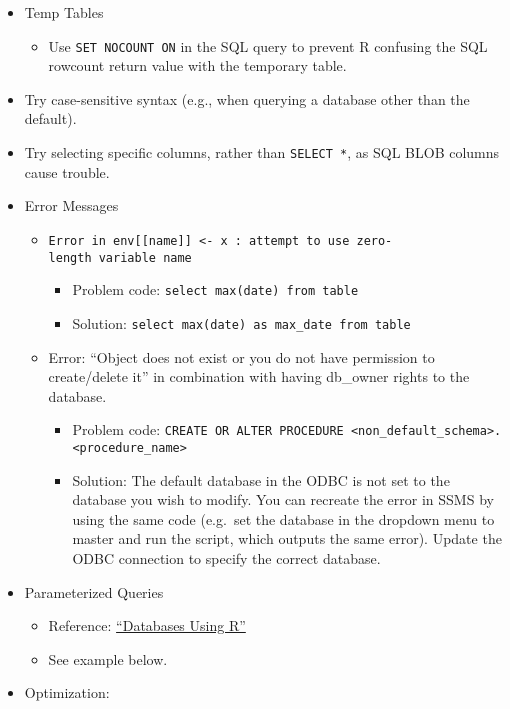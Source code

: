 \documentclass[
]{book}
\providecommand{\tightlist}{%
  \setlength{\itemsep}{0pt}\setlength{\parskip}{0pt}}
\begin{document}
\begin{itemize}
\tightlist
\item
  Temp Tables

  \begin{itemize}
  \tightlist
  \item
    Use \texttt{SET\ NOCOUNT\ ON} in the SQL query to prevent R confusing the SQL rowcount return value with the temporary table.
  \end{itemize}
\item
  Try case-sensitive syntax (e.g., when querying a database other than the default).
\item
  Try selecting specific columns, rather than \texttt{SELECT\ *}, as SQL BLOB columns cause trouble.
\item
  Error Messages

  \begin{itemize}
  \tightlist
  \item
    \texttt{Error\ in\ env{[}{[}name{]}{]}\ \textless{}-\ x\ :\ attempt\ to\ use\ zero-length\ variable\ name}

    \begin{itemize}
    \tightlist
    \item
      Problem code: \texttt{select\ max(date)\ from\ table}
    \item
      Solution: \texttt{select\ max(date)\ as\ max\_date\ from\ table}
    \end{itemize}
  \item
    Error: ``Object does not exist or you do not have permission to create/delete it'' in combination with having db\_owner rights to the database.

    \begin{itemize}
    \tightlist
    \item
      Problem code: \texttt{CREATE\ OR\ ALTER\ PROCEDURE\ \textless{}non\_default\_schema\textgreater{}.\textless{}procedure\_name\textgreater{}}
    \item
      Solution: The default database in the ODBC is not set to the database you wish to modify. You can recreate the error in SSMS by using the same code (e.g.~set the database in the dropdown menu to master and run the script, which outputs the same error). Update the ODBC connection to specify the correct database.
    \end{itemize}
  \end{itemize}
\item
  Parameterized Queries

  \begin{itemize}
  \tightlist
  \item
    Reference: \href{https://db.rstudio.com/}{``Databases Using R''}
  \item
    See example below.
  \end{itemize}
\item
  Optimization:


\end{itemize}
\end{document}
